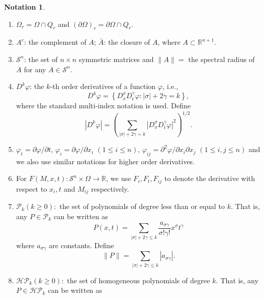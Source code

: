 \documentclass[preprint,12pt]{elsarticle}
\theoremstyle{definition}
\newtheorem{notation}[theorem]{Notation}
\theoremstyle{remark}
\numberwithin{equation}{section}
\begin{document}
\begin{notation}
\begin{enumerate}
\item $\Omega_r=\Omega\cap Q_r$ and $(\partial\Omega)_r=\partial\Omega\cap Q_r$.
\item $A^c$: the complement of $A$; $\bar A $: the closure of $A$, where $ A\subset \mathbb{R}^{n+1}$.
\item $\mathcal{S}^{n}$: the set of $n\times n$ symmetric matrices and $\|A\|=$ the spectral radius of $A$ for any $A\in \mathcal{S}^{n}$.
\item $D^k \varphi$: the $k$-th order derivatives of a function $\varphi$, i.e.,
     \begin{equation*}
    D^k \varphi=\left\{D_{x}^{\sigma}D_{t}^{\gamma} \varphi:|\sigma|+2\gamma=k\right\},
     \end{equation*}
     where the standard multi-index notation is used. Define
     \begin{equation*}
       |D^k\varphi |
    =\left(\sum_{|\sigma|+2\gamma=k}|D_{x}^{\sigma}D_{t}^{\gamma}\varphi|^2\right)^{1/2}.
     \end{equation*}
\item $\varphi_t=\partial  \varphi/\partial t$, $\varphi _i=\partial \varphi/\partial x _{i}$ $(1\leq i\leq n)$, $\varphi _{ij} =\partial ^{2}\varphi/\partial x_{i}\partial x_{j}$ $(1\leq i,j\leq n)$ and we also use similar notations for higher order derivatives.
\item For $F(M,x,t):\mathcal{S}^n\times \Omega\rightarrow \mathbb{R}$, we use $F_i,F_t,F_{ij}$ to denote the derivative with respect to $x_i,t$ and $M_{ij}$ respectively.
\item $\mathcal{P}_k (k\geq 0):$ the set of polynomials of degree less than or equal to $k$. That is, any $P\in \mathcal{P}_k$ can be written as
\begin{equation*}
P(x,t)=\sum_{|\sigma|+2\gamma\leq k}\frac{a_{\sigma\gamma}}{\sigma!\gamma!}x^{\sigma}t^{\gamma}
\end{equation*}
where $a_{\sigma\gamma}$ are constants. Define
\begin{equation*}
\|P\|= \sum_{|\sigma|+2\gamma \leq k}|a_{\sigma\gamma}|.
\end{equation*}
\item $\mathcal{HP}_k (k\geq 0):$ the set of homogeneous polynomials of degree $k$. That is, any $P\in \mathcal{HP}_k$ can be written as

\end{enumerate}
\end{notation}
\end{document}
